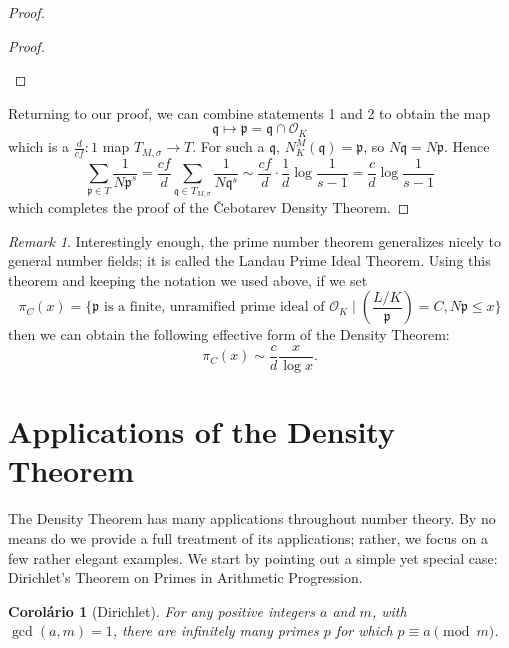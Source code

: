 \documentclass{article}
\theoremstyle{plain}
\newtheorem{cor}[thm]{Corolário}
\theoremstyle{definition}
\theoremstyle{remark}
\newtheorem{rem}[thm]{Remark}
\numberwithin{equation}{section}
\numberwithin{thm}{section}
\begin{document}
\begin{proof}
\begin{proof}
\begin{enumerate}
\end{enumerate}

\end{proof}

Returning to our proof, we can combine statements 1 and 2 to obtain the map $$\mathfrak{q} \mapsto \mathfrak{p} = \mathfrak{q} \cap \mathcal{O}_K$$ which is a $\frac{d}{cf} : 1$ map $T_{M, \sigma} \to T$. For such a $\mathfrak{q}$, $N_{K}^{M}(\mathfrak{q}) = \mathfrak{p}$, so $N\mathfrak{q} = N\mathfrak{p}$. Hence $$\sum_{\mathfrak{p} \in T} \frac{1}{N\mathfrak{p}^{s}} = \frac{cf}{d} \sum_{\mathfrak{q} \in T_{M, \sigma}} \frac{1}{N\mathfrak{q}^{s}} \sim \frac{cf}{d} \cdot \frac{1}{d} \log\frac{1}{s-1} = \frac{c}{d} \log\frac{1}{s-1}$$ which completes the proof of the Čebotarev Density Theorem. 
\end{proof}

\begin{rem}
Interestingly enough, the prime number theorem generalizes nicely to general number fields; it is called the Landau Prime Ideal Theorem. Using this theorem and keeping the notation we used above, if we set $$\pi_{C}(x) = \{\mathfrak{p} \text{ is a finite, unramified prime ideal of } \mathcal{O}_{K} \mid \left(\frac{L/K}{\mathfrak{p}}\right) = C, N\mathfrak{p} \leq x\}$$ then we can obtain the following effective form of the Density Theorem: $$\pi_{C}(x) \sim \frac{c}{d} \frac{x}{\log x}.$$
\end{rem}

\section{Applications of the Density Theorem}

The Density Theorem has many applications throughout number theory. By no means do we provide a full treatment of its applications; rather, we focus on a few rather elegant examples. We start by pointing out a simple yet special case: Dirichlet's Theorem on Primes in Arithmetic Progression. 

\begin{cor}[Dirichlet]
For any positive integers $a$ and $m$, with $\gcd(a, m) = 1$, there are infinitely many primes $p$ for which $p \equiv a \pmod{m}$. 
\end{cor}
\end{document}
